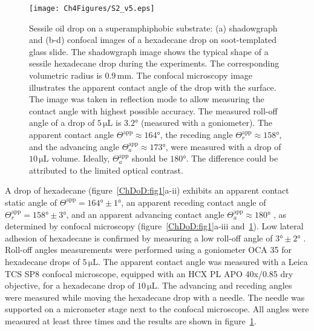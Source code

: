 \begin{subappendices}
	\begin{figure}
		\centering
		\texttt{[image: Ch4Figures/S2\_v5.eps]}
		\caption{Sessile oil drop on a superamphiphobic substrate: (a) shadowgraph  and (b-d) confocal images of a hexadecane drop on soot-templated glass slide. The shadowgraph image shows the typical shape of a sessile hexadecane drop during the experiments. The corresponding volumetric radius is $0.9\,\si{\milli\meter}$. The confocal microscopy image illustrates the apparent contact angle of the drop with the surface. The image was taken in reflection mode to allow measuring the contact angle with highest possible accuracy. The measured roll-off angle of a drop of $5\,\si{\micro\liter}$ is $3.2\si{\degree}$ (measured with a goniometer). The apparent contact angle $\Theta^{\text{app}} \approx 164\si{\degree}$, the receding angle $\Theta_r^{\text{app}} \approx 158\si{\degree}$, and the advancing angle $\Theta_a^{\text{app}} \approx 173\si{\degree}$, were measured with a drop of $10\,\si{\micro\liter}$ volume. Ideally, $\Theta_a^{\text{app}}$ should be $180\si{\degree}$. The difference could be attributed to the limited optical contrast.}
		\label{ChDoD:figS2}
	\end{figure}

	A drop of hexadecane (figure~\ref{ChDoD:fig1}a-ii) exhibits an apparent contact static angle of $\Theta^{\text{app}} = 164\si{\degree} \pm 1\si{\degree}$, an apparent receding contact angle of $\Theta_r^{\text{app}} = 158\si{\degree} \pm 3\si{\degree}$, and an apparent advancing contact angle $\Theta_a^{\text{app}} \approx 180\si{\degree}$ \citep{schellenberger2016}, as determined by confocal microscopy (figure~\ref{ChDoD:fig1}a-iii and~\ref{ChDoD:figS2}). Low lateral adhesion of hexadecane is confirmed by measuring a low roll-off angle of $3\si{\degree} \pm 2\si{\degree}$ \cite{quere2002fakir, elsherbini2006}. Roll-off angles measurements were performed using a goniometer OCA 35 for hexadecane drops of $5\,\si{\micro\liter}$. The apparent contact angle was measured with a Leica TCS SP8 confocal microscope, equipped with an HCX PL APO 40x/0.85 dry objective, for a hexadecane drop of $10\,\si{\micro\liter}$. The advancing and receding angles were measured while moving the hexadecane drop with a needle. The needle was supported on a micrometer stage next to the confocal microscope. All angles were measured at least three times and the results are shown in figure~\ref{ChDoD:figS2}.
	

\end{subappendices}
